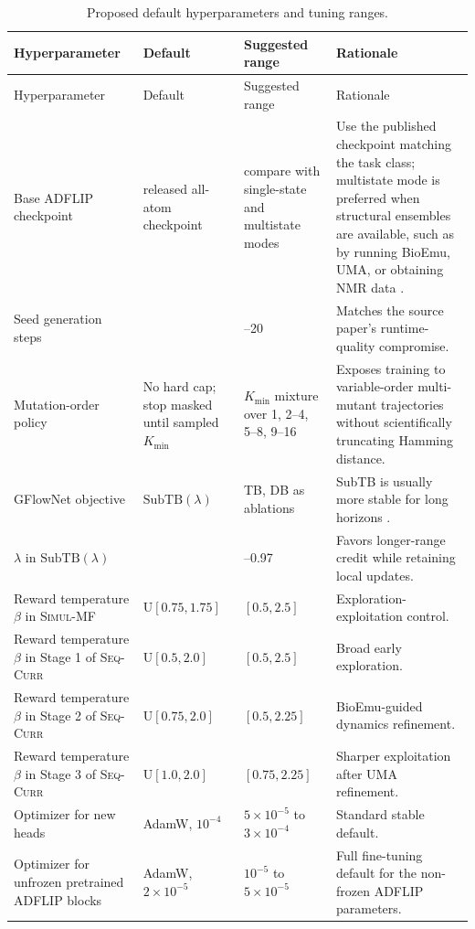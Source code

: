 \documentclass[11pt]{article}
\newcommand{\SubTB}{\ensuremath{\mathrm{SubTB}}}
\newcommand{\methodI}{\textsc{Simul-MF}}
\newcommand{\methodII}{\textsc{Seq-Curr}}
\begin{document}
	\begin{longtable}{>{\raggedright\arraybackslash}p{} >{\raggedright\arraybackslash}p{} >{\raggedright\arraybackslash}p{} >{\raggedright\arraybackslash}p{}}
		\caption{Proposed default hyperparameters and tuning ranges.}\label{tab:hyper}\\
		\toprule
		Hyperparameter & Default & Suggested range & Rationale \\
		\midrule
		\endfirsthead
		\toprule
		Hyperparameter & Default & Suggested range & Rationale \\
		\midrule
		\endhead
		Base ADFLIP checkpoint & released all-atom checkpoint & compare with single-state and multistate modes & Use the published checkpoint matching the task class; multistate mode is preferred when structural ensembles are available, such as by running BioEmu, UMA, or obtaining NMR data \citep{yi2025adflip}. \\
		Seed generation steps & 10 & 5--20 & Matches the source paper's runtime-quality compromise. \\
		Mutation-order policy & No hard cap; stop masked until sampled $K_{\min}$ & $K_{\min}$ mixture over 1, 2--4, 5--8, 9--16 & Exposes training to variable-order multi-mutant trajectories without scientifically truncating Hamming distance. \\
		GFlowNet objective & $\SubTB(\lambda)$ & TB, DB as ablations & SubTB is usually more stable for long horizons \citep{madan2023subtb}. \\
		$\lambda$ in $\SubTB(\lambda)$ & 0.9 & 0.7--0.97 & Favors longer-range credit while retaining local updates. \\
		Reward temperature $\beta$ in \methodI{} & $\mathrm U[0.75,1.75]$ & $[0.5,2.5]$ & Exploration-exploitation control. \\
		Reward temperature $\beta$ in Stage 1 of \methodII{} & $\mathrm U[0.5,2.0]$ & $[0.5,2.5]$ & Broad early exploration. \\
		Reward temperature $\beta$ in Stage 2 of \methodII{} & $\mathrm U[0.75,2.0]$ & $[0.5,2.25]$ & BioEmu-guided dynamics refinement. \\
		Reward temperature $\beta$ in Stage 3 of \methodII{} & $\mathrm U[1.0,2.0]$ & $[0.75,2.25]$ & Sharper exploitation after UMA refinement. \\
		Optimizer for new heads & AdamW, $10^{-4}$ & $5\times10^{-5}$ to $3\times10^{-4}$ & Standard stable default. \\
		Optimizer for unfrozen pretrained ADFLIP blocks & AdamW, $2\times10^{-5}$ & $10^{-5}$ to $5\times10^{-5}$ & Full fine-tuning default for the non-frozen ADFLIP parameters. \\

\end{longtable}
\end{document}
